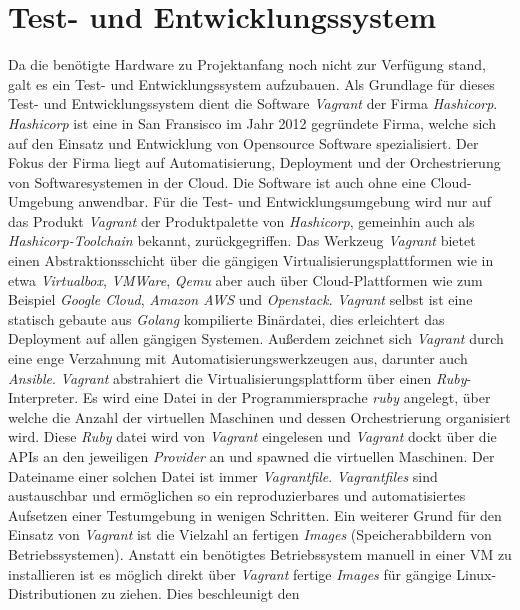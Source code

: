 \documentclass[titlepage]{report}
\begin{document}
\section*{Test- und Entwicklungssystem}
Da die benötigte Hardware zu Projektanfang noch nicht zur Verfügung
stand, galt es ein Test\hyp{} und Entwicklungssystem aufzubauen. Als
Grundlage für dieses Test\hyp{} und Entwicklungssystem dient die
Software \emph{Vagrant}\cite{VAGRANT} der Firma \emph{Hashicorp}. \emph{Hashicorp} ist
eine in San Fransisco im Jahr 2012 gegründete Firma, welche sich auf den
Einsatz und Entwicklung von Opensource Software
spezialisiert\cite{HASHICORP}. Der Fokus der Firma liegt auf
Automatisierung, Deployment und der Orchestrierung von
Softwaresystemen in der Cloud. Die Software ist auch ohne
eine Cloud\hyp{}Umgebung anwendbar. Für die Test\hyp{} und
Entwicklungsumgebung wird nur auf das Produkt \emph{Vagrant} der Produktpalette von
\emph{Hashicorp}, gemeinhin auch als \emph{Hashicorp-Toolchain} bekannt,
zurückgegriffen. Das Werkzeug \emph{Vagrant} bietet einen
Abstraktionsschicht über die gängigen Virtualisierungsplattformen wie in
etwa \emph{Virtualbox}, \emph{VMWare}, \emph{Qemu} aber auch über
Cloud\hyp{}Plattformen wie zum Beispiel \emph{Google Cloud},
\emph{Amazon AWS} und \emph{Openstack}. \emph{Vagrant} selbst ist eine
statisch gebaute aus \emph{Golang} kompilierte Binärdatei, dies
erleichtert das Deployment auf allen gängigen Systemen. Außerdem
zeichnet sich \emph{Vagrant} durch eine enge Verzahnung mit
Automatisierungswerkzeugen aus, darunter auch
\emph{Ansible}\cite{VAGRANT_DOCS}. \emph{Vagrant} abstrahiert die
Virtualisierungsplattform über einen \emph{Ruby}\hyp{}Interpreter. Es
wird eine Datei in der Programmiersprache \emph{ruby} angelegt, über
welche die Anzahl der virtuellen Maschinen und dessen Orchestrierung
organisiert wird. Diese \emph{Ruby} datei wird von \emph{Vagrant}
eingelesen und \emph{Vagrant} dockt über die APIs an den jeweiligen
\emph{Provider} an und spawned die virtuellen Maschinen. Der Dateiname
einer solchen Datei ist immer \emph{Vagrantfile}. \emph{Vagrantfiles}
sind austauschbar und ermöglichen so ein reproduzierbares und
automatisiertes Aufsetzen einer Testumgebung in wenigen Schritten. Ein
weiterer Grund für den Einsatz von \emph{Vagrant} ist die Vielzahl an
fertigen \emph{Images} (Speicherabbildern von Betriebssystemen). Anstatt
ein benötigtes Betriebssystem manuell in einer VM zu installieren ist es
möglich direkt über \emph{Vagrant} fertige \emph{Images} für gängige
Linux\hyp{}Distributionen zu ziehen. Dies beschleunigt den
\end{document}
